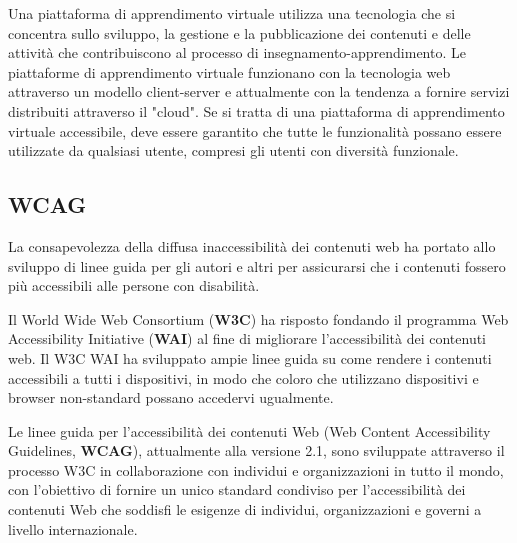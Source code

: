 Una piattaforma di apprendimento virtuale utilizza una tecnologia che si concentra sullo sviluppo, la gestione e la pubblicazione dei contenuti e delle attività che contribuiscono al processo di insegnamento-apprendimento. Le piattaforme di apprendimento virtuale funzionano con la tecnologia web attraverso un modello client-server e attualmente con la tendenza a fornire servizi distribuiti attraverso il "cloud". Se si tratta di una piattaforma di apprendimento virtuale accessibile, deve essere garantito che tutte le funzionalità possano essere utilizzate da qualsiasi utente, compresi gli utenti con diversità funzionale\cite{edures}.

\subsection{WCAG}
La consapevolezza della diffusa inaccessibilità dei contenuti web ha portato  allo sviluppo di linee guida per gli autori e altri per assicurarsi che i contenuti fossero più accessibili alle persone con disabilità. 

Il World Wide Web Consortium (\textbf{W3C}) ha risposto fondando il programma Web Accessibility Initiative (\textbf{WAI}) al fine di migliorare l'accessibilità dei contenuti web. Il W3C WAI ha sviluppato ampie linee guida su come rendere i contenuti accessibili a tutti i dispositivi, in modo che coloro che utilizzano dispositivi e browser non-standard possano accedervi ugualmente.

Le linee guida per l'accessibilità dei contenuti Web (Web Content Accessibility Guidelines, \textbf{WCAG}), attualmente alla versione 2.1, sono sviluppate attraverso il processo W3C in collaborazione con individui e organizzazioni in tutto il mondo, con l'obiettivo di fornire un unico standard condiviso per l'accessibilità dei contenuti Web che soddisfi le esigenze di individui, organizzazioni e governi a livello internazionale\cite{wcag}.


